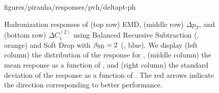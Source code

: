 \begin{figure}[p]
{      {figures/piranha/responses/pvh/deltapt-ph}
      \label{fig:ph_pt_delta}
}
\\
\caption{
    Hadronization responses of (top row) EMD, (middle row) \(\Delta p_T\), and (bottom row) \(\Delta C_1^{(2)}\) using Balanced Recursive Subtraction (, orange) and Soft Drop with \(\beta_{\rm SD} = 2\) (, blue).
    We display (left column) the distribution of the response for , (middle column) the mean response as a function of \zcut, and (right column) the standard deviation of the response as a function of \zcut.
%
The red arrows indicate the direction corresponding to better performance.
}
\label{fig:parton_hadron_response}
\end{figure}

